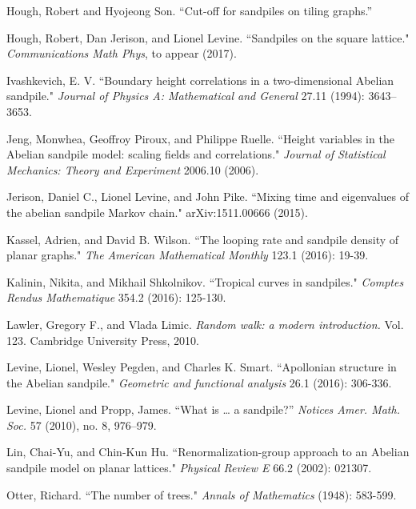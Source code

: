 \documentclass[a4paper, 12pt, notitlepage]{amsart}
\theoremstyle{remark}
\begin{document}
\begin{thebibliography}{1}
Hough, Robert and Hyojeong Son.
\newblock ``Cut-off for sandpiles on tiling graphs.'' 

Hough, Robert, Dan Jerison, and Lionel Levine. 
\newblock ``Sandpiles on the square lattice." 
\newblock \emph{Communications Math Phys}, to appear (2017).


Ivashkevich, E. V. 
\newblock ``Boundary height correlations in a two-dimensional Abelian sandpile." 
\newblock \emph{Journal of Physics A: Mathematical and General} 27.11 (1994): 3643--3653.


Jeng, Monwhea, Geoffroy Piroux, and Philippe Ruelle. 
\newblock ``Height variables in the Abelian sandpile model: scaling fields and correlations."
\newblock \emph{Journal of Statistical Mechanics: Theory and Experiment} 2006.10 (2006).

Jerison, Daniel C., Lionel Levine, and John Pike. 
\newblock ``Mixing time and eigenvalues of the abelian sandpile Markov chain." 
\newblock arXiv:1511.00666 (2015).



Kassel, Adrien, and David B. Wilson. 
\newblock``The looping rate and sandpile density of planar graphs." 
\newblock \emph{The American Mathematical Monthly} 123.1 (2016): 19-39.

Kalinin, Nikita, and Mikhail Shkolnikov. 
\newblock ``Tropical curves in sandpiles." 
\newblock \emph{Comptes Rendus Mathematique} 354.2 (2016): 125-130.

Lawler, Gregory F., and Vlada Limic. 
\newblock \emph{Random walk: a modern introduction.}
\newblock Vol. 123. Cambridge University Press, 2010.

Levine, Lionel, Wesley Pegden, and Charles K. Smart. 
\newblock ``Apollonian structure in the Abelian sandpile." 
\newblock \emph{Geometric and functional analysis} 26.1 (2016): 306-336.

Levine, Lionel and Propp, James.
\newblock ``What is … a sandpile?'' 
\newblock \emph{Notices Amer. Math. Soc.} 57 (2010), no. 8, 976–979. 

Lin, Chai-Yu, and Chin-Kun Hu. 
\newblock ``Renormalization-group approach to an Abelian sandpile model on planar lattices." 
\newblock \emph{Physical Review E} 66.2 (2002): 021307.


Otter, Richard. 
\newblock ``The number of trees." \emph{Annals of Mathematics} (1948): 583-599.


\end{thebibliography}
\end{document}
